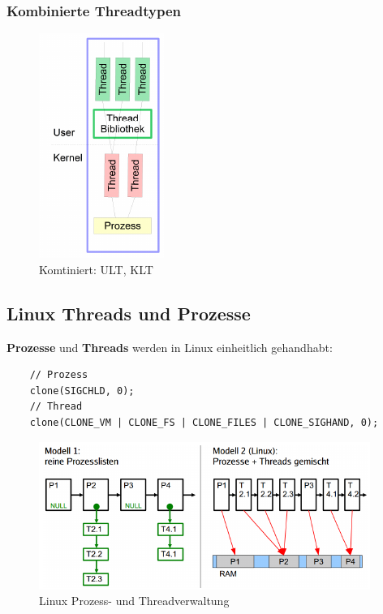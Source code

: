 \subsubsection{Kombinierte Threadtypen}
\begin{figure}[ht!]
    \includegraphics[scale=.8]{pics/ultklt}
    \caption{Komtiniert: ULT, KLT}
\end{figure}

\subsection{Linux Threads und Prozesse}
\textbf{Prozesse} und \textbf{Threads} werden in Linux einheitlich gehandhabt:
\begin{lstlisting}
    // Prozess
    clone(SIGCHLD, 0);
    // Thread
    clone(CLONE_VM | CLONE_FS | CLONE_FILES | CLONE_SIGHAND, 0);
\end{lstlisting}

\begin{figure}[ht!]
    \includegraphics[scale=.8]{pics/linux_ps_th}
    \caption{Linux Prozess- und Threadverwaltung}
\end{figure}
